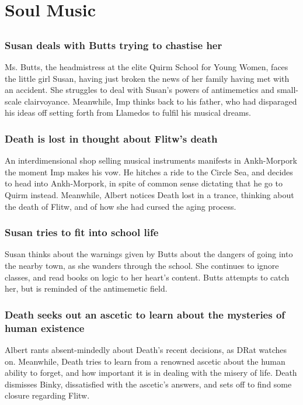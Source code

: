 \section{Soul Music}


\subsection{}
\subsubsection{\Gls{Susan} deals with \Gls{Butts} trying to chastise her}
Ms. \Gls{Butts}, the headmistress at the elite Quirm School for Young Women, faces the little girl
\Gls{Susan}, having just broken the news of her family having met with an accident. She struggles
to deal with \Gls{Susan}'s powers of antimemetics and small-scale clairvoyance. Meanwhile, \Gls{Imp}
thinks back to his father, who had disparaged his ideas off setting forth from Llamedos to fulfil
his musical dreams.

\subsubsection{\Gls{Death} is lost in thought about \Gls{Flitw}'s death}
An interdimensional shop selling musical instruments manifests in Ankh-Morpork the moment \Gls{Imp}
makes his vow. He hitches a ride to the Circle Sea, and decides to head into Ankh-Morpork, in spite
of common sense dictating that he go to Quirm instead. Meanwhile, \Gls{Albert} notices \Gls{Death} lost in a trance, thinking about the
death of \Gls{Flitw}, and of how she had cursed the aging process.

\subsubsection{\Gls{Susan} tries to fit into school life}
\Gls{Susan} thinks about the warnings given by \Gls{Butts} about the dangers of going into the
nearby town, as she wanders through the school. She continues to ignore classes, and read books on
logic to her heart's content. \Gls{Butts} attempts to catch her, but is reminded of the antimemetic
field.

\subsubsection{\Gls{Death} seeks out an ascetic to learn about the mysteries of human existence}
\Gls{Albert} rants absent-mindedly about \Gls{Death}'s recent decisions, as \Gls{DRat} watches on.
Meanwhile, \Gls{Death} tries to learn from a renowned ascetic about the human ability to forget, and
how important it is in dealing with the misery of life. \Gls{Death} dismisses \Gls{Binky},
dissatisfied with the ascetic's answers, and sets off to find some closure regarding \Gls{Flitw}.

